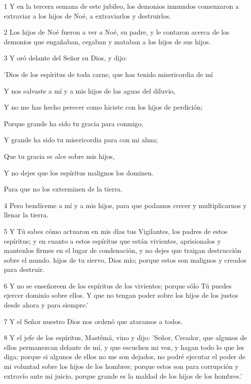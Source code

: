 \par 1 Y en la tercera semana de este jubileo, los demonios inmundos comenzaron a extraviar a los hijos de Noé, a extraviarlos y destruirlos.
\par 2 Los hijos de Noé fueron a ver a Noé, su padre, y le contaron acerca de los demonios que engañaban, cegaban y mataban a los hijos de sus hijos.
\par 3 Y oró delante del Señor su Dios, y dijo:
\par    
\par     'Dios de los espíritus de toda carne, que has tenido misericordia de mí  
\par     Y nos salvaste a mí y a mis hijos de las aguas del diluvio,  
\par     Y no me has hecho perecer como hiciste con los hijos de perdición;
\par    
\par     Porque grande ha sido tu gracia para conmigo,  
\par     Y grande ha sido tu misericordia para con mi alma;
\par    
\par     Que tu gracia se alce sobre mis hijos,  
\par     Y no dejes que los espíritus malignos los dominen.  
\par     Para que no los exterminen de la tierra.
\par    
\par 4 Pero bendíceme a mí y a mis hijos, para que podamos crecer y multiplicarnos y llenar la tierra.
\par 5 Y Tú sabes cómo actuaron en mis días tus Vigilantes, los padres de estos espíritus; y en cuanto a estos espíritus que están vivientes, aprisionalos y mantenlos firmes en el lugar de condenación, y no dejes que traigan destrucción sobre el mundo. hijos de tu siervo, Dios mío; porque estos son malignos y creados para destruir.
\par 6 Y no se enseñoreen de los espíritus de los vivientes; porque sólo Tú puedes ejercer dominio sobre ellos. Y que no tengan poder sobre los hijos de los justos desde ahora y para siempre.'
\par 7 Y el Señor nuestro Dios nos ordenó que ataramos a todos.
\par 8 Y el jefe de los espíritus, Mastêmâ, vino y dijo: 'Señor, Creador, que algunos de ellos permanezcan delante de mí, y que escuchen mi voz, y hagan todo lo que les diga; porque si algunos de ellos no me son dejados, no podré ejecutar el poder de mi voluntad sobre los hijos de los hombres; porque estos son para corrupción y extravío ante mi juicio, porque grande es la maldad de los hijos de los hombres.'
